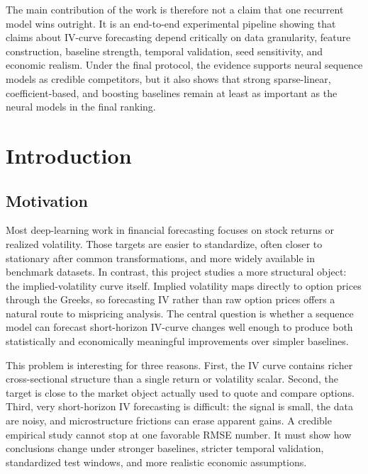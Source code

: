 \documentclass[12pt]{report}
\begin{document}
The main contribution of the work is therefore not a claim that one recurrent model wins outright. It is an end-to-end experimental pipeline showing that claims about IV-curve forecasting depend critically on data granularity, feature construction, baseline strength, temporal validation, seed sensitivity, and economic realism. Under the final protocol, the evidence supports neural sequence models as credible competitors, but it also shows that strong sparse-linear, coefficient-based, and boosting baselines remain at least as important as the neural models in the final ranking.

\tableofcontents
\clearpage
{}

\chapter{Introduction}

\section{Motivation}
Most deep-learning work in financial forecasting focuses on stock returns or realized volatility. Those targets are easier to standardize, often closer to stationary after common transformations, and more widely available in benchmark datasets. In contrast, this project studies a more structural object: the implied-volatility curve itself. Implied volatility maps directly to option prices through the Greeks, so forecasting IV rather than raw option prices offers a natural route to mispricing analysis. The central question is whether a sequence model can forecast short-horizon IV-curve changes well enough to produce both statistically and economically meaningful improvements over simpler baselines.

This problem is interesting for three reasons. First, the IV curve contains richer cross-sectional structure than a single return or volatility scalar. Second, the target is close to the market object actually used to quote and compare options. Third, very short-horizon IV forecasting is difficult: the signal is small, the data are noisy, and microstructure frictions can erase apparent gains. A credible empirical study cannot stop at one favorable RMSE number. It must show how conclusions change under stronger baselines, stricter temporal validation, standardized test windows, and more realistic economic assumptions.
\end{document}
